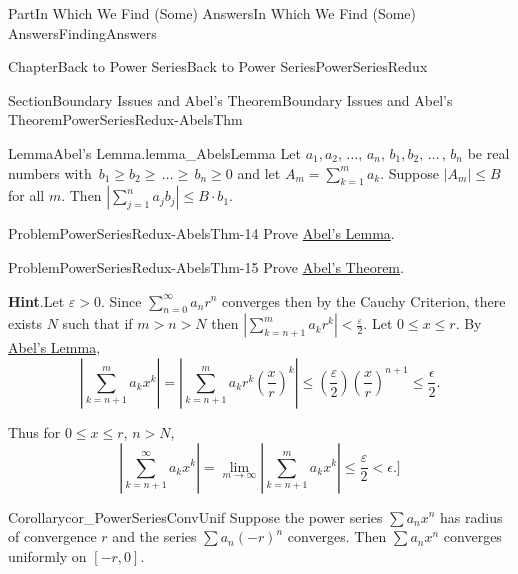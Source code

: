 \documentclass[oneside,10pt,]{book}
\newcommand{\blocktitlefont}{\relax}
\newcommand{\xreffont}{\relax}
\numberwithin{equation}{part}
\newcommand{\abs}[1]{\left|#1\right|}
\def\limit#1#2#3{{\displaystyle\lim_{#1\rightarrow #2}#3}}
\newcommand{\eps}{\varepsilon}
\newcommand{\lt}{<}
\newcommand{\gt}{>}
\begin{document}
\begin{partptx}{Part}{In Which We Find (Some) Answers}{}{In Which We Find (Some) Answers}{}{}{FindingAnswers}
\begin{chapterptx}{Chapter}{Back to Power Series}{}{Back to Power Series}{}{}{PowerSeriesRedux}
\begin{sectionptx}{Section}{Boundary Issues and Abel's Theorem}{}{Boundary Issues and Abel's Theorem}{}{}{PowerSeriesRedux-AbelsThm}
\begin{lemma}{Lemma}{Abel's Lemma.}{}{lemma_AbelsLemma}%
Let \(a_1,a_2,\,\ldots,\,a_n,\,b_1,b_2,\,\ldots\,,\,b_n\) be real numbers with \(\,b_1\geq
b_2\geq\,\ldots\geq\,b_n\geq 0\) and let \(A_m=\displaystyle\sum_{k=1}^ma_k\).  Suppose \(|A_m|\leq B\) for all \(m\).  Then \(\displaystyle\abs{\sum_{j=1}^na_jb_j}\leq B\cdot
b_1\).%
\end{lemma}
\begin{problem}{Problem}{}{PowerSeriesRedux-AbelsThm-14}%
Prove \hyperref[lemma_AbelsLemma]{Abel's Lemma}.%
\end{problem}
\begin{problem}{Problem}{}{PowerSeriesRedux-AbelsThm-15}%
Prove \hyperref[AbelsTheorem]{Abel's Theorem}.%
\par\smallskip%
\noindent\textbf{\blocktitlefont Hint}.\hypertarget{PowerSeriesRedux-AbelsThm-15-3}{}\quad{}Let \(\eps\gt0\).  Since \(\displaystyle{}\sum_{n=0}^\infty
a_nr^n\) converges then by the Cauchy Criterion, there exists \(N\) such that if \(m>n>N\) then \(\abs{\displaystyle \sum_{k=n+1}^ma_kr^k}\lt \frac{\eps }{2}\). Let \(0\leq x\leq r\). By \hyperref[lemma_AbelsLemma]{Abel's Lemma},%
\begin{equation*}
\abs{\sum_{k=n+1}^ma_kx^k}=\abs{\sum_{k=n+1}^ma_kr^k\left(\frac{x}{r}\right)^k}\leq \left(\frac{\eps }{2}\right)\left(\frac{x}{r}\right)^{n+1}\leq\frac{\epsilon}{2}\text{.}
\end{equation*}
%
\par
Thus for \(0\leq x\leq r\), \(n>N\),%
\begin{equation*}
\abs{\sum_{k=n+1}^\infty
a_kx^k}=\limit{m}{\infty}{\abs{\sum_{k=n+1}^ma_kx^k}}\leq\frac{\eps }{2}\lt \epsilon.\rbrack{}
\end{equation*}
%
\end{problem}
\begin{corollary}{Corollary}{}{}{cor_PowerSeriesConvUnif}%
Suppose the power series \(\sum a_nx^n\) has radius of convergence \(r\) and the series \(\sum
a_n\left(-r\right)^n\) converges.  Then \(\sum a_nx^n\) converges uniformly on \([-r,0]\).%
\end{corollary}
\end{sectionptx}
\end{chapterptx}
\end{partptx}
\end{document}
